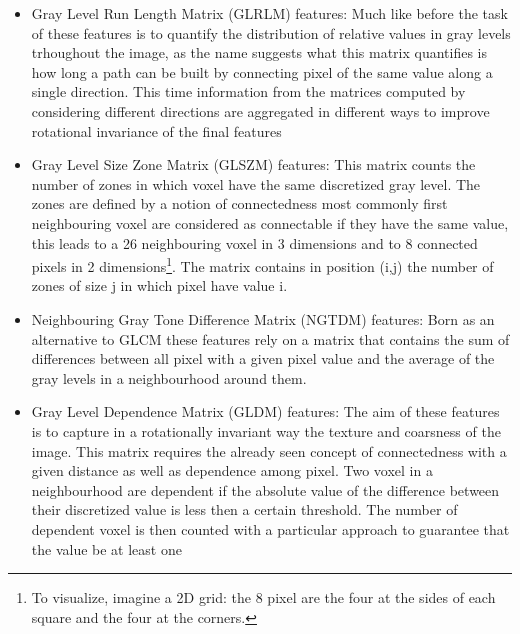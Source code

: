 \begin{enumerate}
\begin{itemize}
		\item Gray Level Run Length Matrix (GLRLM) features: Much like before the task of these features is to quantify the distribution of relative values in gray levels trhoughout the image, as the name suggests what this matrix quantifies is how long a path can be built by connecting pixel of the same value along a single direction. This time information from the matrices computed by considering different directions are aggregated in different ways to improve rotational invariance of the final features
		\item Gray Level Size Zone Matrix (GLSZM) features: This matrix counts the number of zones in which voxel have the same discretized gray level. The zones are defined by a notion of connectedness most commonly first neighbouring voxel are considered as connectable if they have the same value, this leads to a 26 neighbouring voxel in 3 dimensions and to 8 connected pixels in 2 dimensions\footnote{To visualize, imagine a 2D grid: the 8 pixel are the four at the sides of each square and the four at the corners.}. The matrix contains in position (i,j) the number of zones of size j in which pixel have value i.
		\item Neighbouring Gray Tone Difference Matrix (NGTDM) features: Born as an alternative to GLCM these features rely on a matrix that contains the sum of differences between all pixel with a given pixel value and the average of the gray levels in a neighbourhood around  them.
		\item Gray Level Dependence Matrix (GLDM) features: The aim of these features is to capture in a rotationally invariant way the texture and coarsness of the image. This matrix requires the already seen concept of connectedness with a given distance as well as dependence among pixel. Two voxel in a neighbourhood are dependent if the absolute value of the difference between their discretized value is less then a certain threshold. The number of dependent voxel is then counted with a particular approach to guarantee that the value be at least one
	\end{itemize}
\end{enumerate}

